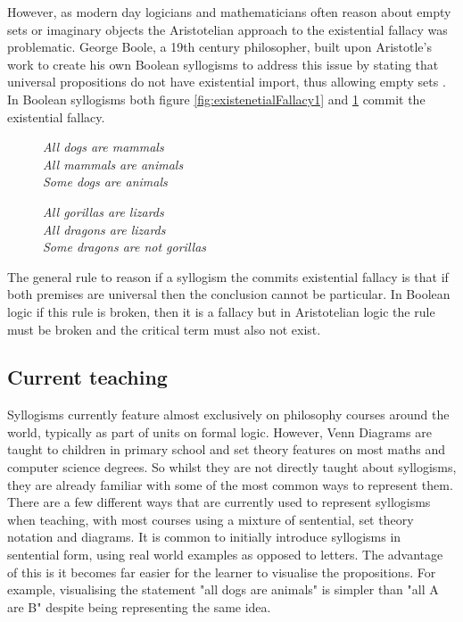\documentclass[12pt,a4paper]{report}
\newenvironment{tightcenter}{%
  \setlength\topsep{0pt}
  \setlength\parskip{0pt}
  \begin{center}
}{%
  \end{center}
}
\begin{document}
However, as modern day logicians and mathematicians often reason about empty sets or imaginary objects the Aristotelian approach to the existential fallacy was problematic. George Boole, a 19th century philosopher, built upon Aristotle's work to create his own Boolean syllogisms to address this issue by stating that universal propositions do not have existential import, thus allowing empty sets \citep{hammerhill}. In Boolean syllogisms both figure \ref{fig:existenetialFallacy1} and \ref{fig:existenetialFallacy2} commit the existential fallacy.


\begin{figure}[!h]
  \centering
  \begin{minipage}[b]{0.4\textwidth}
    \begin{tightcenter}
		\textit{All dogs are mammals }\\ 
		\textit{All mammals are animals}\\
		\textit{Some dogs are animals}\\
		\end{tightcenter}
		    \caption{}
		    \label{fig:existenetialFallacy1}
  \end{minipage}
  \hfill
  \begin{minipage}[b]{0.4\textwidth}
    \begin{tightcenter}
		\textit{All gorillas are lizards }\\ 
		\textit{All dragons are lizards}\\
		\textit{Some dragons are not gorillas}\\
		\end{tightcenter}
				    \caption{}
		    \label{fig:existenetialFallacy2}
  \end{minipage}
\end{figure}
\FloatBarrier

The general rule to reason if a syllogism the commits existential fallacy is that if both premises are universal then the conclusion cannot be particular. In Boolean logic if this rule is broken, then it is a fallacy but in Aristotelian logic the rule must be broken and the critical term must also not exist.

\subsection{Current teaching}
Syllogisms currently feature almost exclusively on philosophy courses around the world, typically as part of units on formal logic. However, Venn Diagrams are taught to children in primary school and set theory features on most maths and computer science degrees. So whilst they are not directly taught about syllogisms, they are already familiar with some of the most common ways to represent them.
There are a few different ways that are currently used to represent syllogisms when teaching, with most courses using a mixture of sentential, set theory notation and diagrams. 
It is common to initially introduce syllogisms in sentential form, using real world examples as opposed to letters. The advantage of this is it becomes far easier for the learner to visualise the propositions. For example, visualising the statement "all dogs are animals" is simpler than "all A are B" despite being representing the same idea. 
\end{document}
